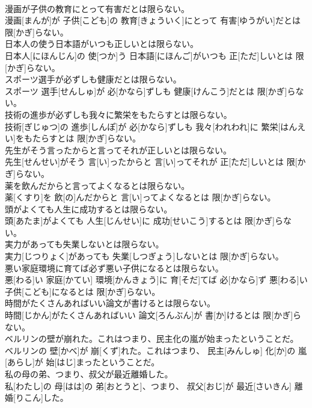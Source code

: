 \documentclass[8pt]{extreport}
\begin{document}
\begin{CJK}{UTF8}{min}
\\	漫画が子供の教育にとって有害だとは限らない。	
\\	漫画[まんが]が 子供[こども]の 教育[きょういく]にとって 有害[ゆうがい]だとは 限[かぎ]らない。
\\	日本人の使う日本語がいつも正しいとは限らない。	
\\	日本人[にほんじん]の 使[つか]う 日本語[にほんご]がいつも 正[ただ]しいとは 限[かぎ]らない。
\\	スポーツ選手が必ずしも健康だとは限らない。	
\\	スポーツ 選手[せんしゅ]が 必[かなら]ずしも 健康[けんこう]だとは 限[かぎ]らない。
\\	技術の進歩が必ずしも我々に繁栄をもたらすとは限らない。	
\\	技術[ぎじゅつ]の 進歩[しんぽ]が 必[かなら]ずしも 我々[われわれ]に 繁栄[はんえい]をもたらすとは 限[かぎ]らない。
\\	先生がそう言ったからと言ってそれが正しいとは限らない。	
\\	先生[せんせい]がそう 言[い]ったからと 言[い]ってそれが 正[ただ]しいとは 限[かぎ]らない。
\\	薬を飲んだからと言ってよくなるとは限らない。	
\\	薬[くすり]を 飲[の]んだからと 言[い]ってよくなるとは 限[かぎ]らない。
\\	頭がよくても人生に成功するとは限らない。	
\\	頭[あたま]がよくても 人生[じんせい]に 成功[せいこう]するとは 限[かぎ]らない。
\\	実力があっても失業しないとは限らない。	
\\	実力[じつりょく]があっても 失業[しつぎょう]しないとは 限[かぎ]らない。
\\	悪い家庭環境に育てば必ず悪い子供になるとは限らない。	
\\	悪[わる]い 家庭[かてい] 環境[かんきょう]に 育[そだ]てば 必[かなら]ず 悪[わる]い 子供[こども]になるとは 限[かぎ]らない。
\\	時間がたくさんあればいい論文が書けるとは限らない。	
\\	時間[じかん]がたくさんあればいい 論文[ろんぶん]が 書[か]けるとは 限[かぎ]らない。
\\	ベルリンの壁が崩れた。これはつまり、民主化の嵐が始まったということだ。	
\\	ベルリンの 壁[かべ]が 崩[くず]れた。これはつまり、 民主[みんしゅ] 化[か]の 嵐[あらし]が 始[はじ]まったということだ。
\\	私の母の弟、つまり、叔父が最近離婚した。	
\\	私[わたし]の 母[はは]の 弟[おとうと]、つまり、 叔父[おじ]が 最近[さいきん] 離婚[りこん]した。

\end{CJK}
\end{document}
